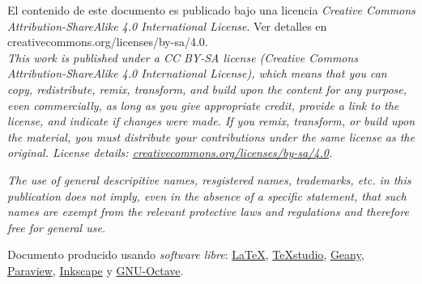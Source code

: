 \vfill
\begin{small}	
	\noindent
	El contenido de este documento es publicado bajo una licencia \textit{Creative Commons Attribution-ShareAlike 4.0 International License}. Ver detalles en creativecommons.org/licenses/by-sa/4.0.\\
	
	\noindent
\textit{
	This work is published under a CC BY-SA license (\textit{Creative Commons Attribution-ShareAlike 4.0 International License}), which means that you can copy, redistribute, remix, transform, and build upon the content for any purpose, even commercially, as long as you give appropriate credit, provide a link to the license, and indicate if changes were made. If you remix, transform, or build upon the material, you must distribute your contributions under the same license as the original. License details: \href{https://creativecommons.org/licenses/by-sa/4.0/}{creativecommons.org/licenses/by-sa/4.0}.
}
	
	\vspace{2mm}
	
	\noindent
\textit{
	The use of general descripitive names, resgistered names, trademarks, etc. in this publication does not imply, even in the absence of a specific statement, that such names are exempt from the relevant protective laws and regulations and therefore free for general use.
}
	
\end{small}

\vspace{3mm}

\noindent
\begin{footnotesize}
	Documento producido usando \textit{software libre}: \href{https://www.latex-project.org/}{\LaTeX}, \href{https://www.texstudio.org/}{TeXstudio}, \href{https://www.geany.org/}{Geany}, \href{https://www.paraview.org/}{Paraview}, \href{https://inkscape.org/}{Inkscape} y \href{https://www.gnu.org/software/octave/}{GNU-Octave}.
\end{footnotesize}
